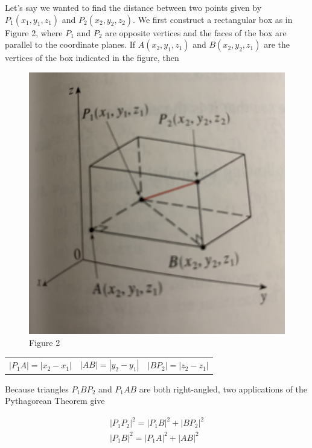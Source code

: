         \noindent Let's say we wanted to find the distance between two points given by
        $P_1(x_1,y_1,z_1)$ and $P_2(x_2,y_2,z_2)$. We first construct a rectangular box as
        in Figure 2, where $P_1$ and $P_2$ are opposite vertices and the faces of the box are
        parallel to the coordinate planes. If $A(x_2,y_1,z_1)$ and $B(x_2,y_2,z_1)$ are the
        vertices of the box indicated in the figure, then

        \begin{figure}[h]
            \centering
            \includegraphics[scale=0.1]{Resources/Unit3Vectors/Fig2.jpg}
            \caption*{Figure 2}
        \end{figure}

        \begin{center}
            \begin{tabular}{ccc}
                $|P_1A|=|x_2-x_1|$
                &  $|AB|=|y_2-y_1|$
                &  $|BP_2|=|z_2-z_1|$
            \end{tabular}
        \end{center}

        \noindent Because triangles $P_1BP_2$ and $P_1AB$ are both right-angled, two applications
        of the Pythagorean Theorem give

        \begin{align*}
            |P_1P_2|^2=|P_1B|^2+|BP_2|^2 \\
            |P_1B|^2=|P_1A|^2+|AB|^2
        \end{align*}

